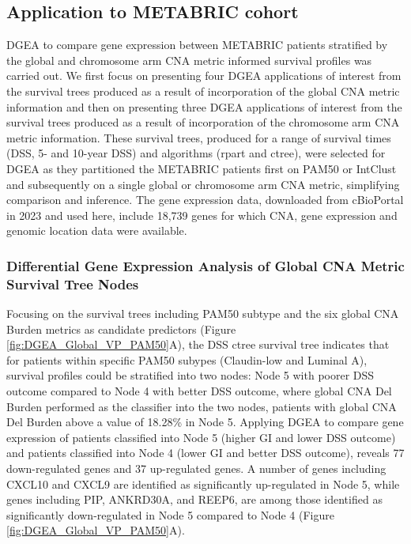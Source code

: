 \subsection{Application to METABRIC cohort}
DGEA to compare gene expression between METABRIC patients stratified by the global and chromosome arm CNA metric informed survival profiles was carried out. We first focus on presenting four DGEA applications of interest from the survival trees produced as a result of incorporation of the global CNA metric information and then on presenting three DGEA applications of interest from the survival trees produced as a result of incorporation of the chromosome arm CNA metric information. These survival trees, produced for a range of survival times (DSS, 5- and 10-year DSS) and algorithms (rpart and ctree), were selected for DGEA as they partitioned the METABRIC patients first on PAM50 or IntClust and subsequently on a single global or chromosome arm CNA metric, simplifying comparison and inference. The gene expression data, downloaded from cBioPortal in 2023 and used here, include 18,739 genes for which CNA, gene expression and genomic location data were available. 

\subsubsection{Differential Gene Expression Analysis of Global CNA Metric Survival Tree Nodes}
\label{Sec_limma}
Focusing on the survival trees including PAM50 subtype and the six global CNA Burden metrics as candidate predictors (Figure \ref{fig:DGEA_Global_VP_PAM50}A), the DSS ctree survival tree indicates that for patients within specific PAM50 subypes (Claudin-low and Luminal A), survival profiles could be stratified into two nodes: Node 5 with poorer DSS outcome compared to Node 4 with better DSS outcome, where global CNA Del Burden performed as the classifier into the two nodes, patients with global CNA Del Burden above a value of 18.28\% in Node 5. Applying DGEA to compare gene expression of patients classified into Node 5 (higher GI and lower DSS outcome) and patients classified into Node 4 (lower GI and better DSS outcome), reveals 77 down-regulated genes and 37 up-regulated genes. A number of genes including CXCL10 and CXCL9 are identified as significantly up-regulated in Node 5, while genes including PIP, ANKRD30A, and REEP6, are among those identified as significantly down-regulated in Node 5 compared to Node 4 (Figure \ref{fig:DGEA_Global_VP_PAM50}A).  

